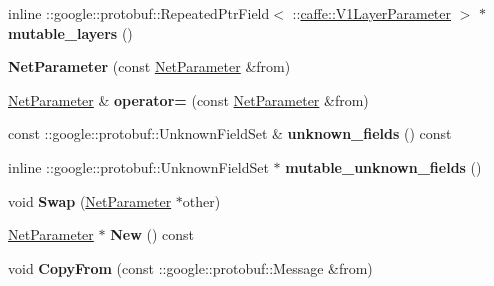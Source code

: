 \begin{DoxyCompactItemize}
\item 
\mbox{\label{classcaffe_1_1_net_parameter_a1a7e3aa151f44233c46fb4d8c928e6c4}} 
inline \+::google\+::protobuf\+::\+Repeated\+Ptr\+Field$<$ \+::\mbox{\hyperlink{classcaffe_1_1_v1_layer_parameter}{caffe\+::\+V1\+Layer\+Parameter}} $>$ $\ast$ {\bfseries mutable\+\_\+layers} ()
\item 
\mbox{\label{classcaffe_1_1_net_parameter_a0d81cc5257aa64aa05868550571624da}} 
{\bfseries Net\+Parameter} (const \mbox{\hyperlink{classcaffe_1_1_net_parameter}{Net\+Parameter}} \&from)
\item 
\mbox{\label{classcaffe_1_1_net_parameter_a2a2737325d6ff315c04d431a873dfb5b}} 
\mbox{\hyperlink{classcaffe_1_1_net_parameter}{Net\+Parameter}} \& {\bfseries operator=} (const \mbox{\hyperlink{classcaffe_1_1_net_parameter}{Net\+Parameter}} \&from)
\item 
\mbox{\label{classcaffe_1_1_net_parameter_a6ed9cbc10b53fbea32d2dfe0bf56fe19}} 
const \+::google\+::protobuf\+::\+Unknown\+Field\+Set \& {\bfseries unknown\+\_\+fields} () const
\item 
\mbox{\label{classcaffe_1_1_net_parameter_aaf4a2a26ac20940adc84b5920a089172}} 
inline \+::google\+::protobuf\+::\+Unknown\+Field\+Set $\ast$ {\bfseries mutable\+\_\+unknown\+\_\+fields} ()
\item 
\mbox{\label{classcaffe_1_1_net_parameter_aaf32716587fbdcfc1fa9c117562c42fd}} 
void {\bfseries Swap} (\mbox{\hyperlink{classcaffe_1_1_net_parameter}{Net\+Parameter}} $\ast$other)
\item 
\mbox{\label{classcaffe_1_1_net_parameter_a9325a430e56f1fadd3aeee0068dd6959}} 
\mbox{\hyperlink{classcaffe_1_1_net_parameter}{Net\+Parameter}} $\ast$ {\bfseries New} () const
\item 
\mbox{\label{classcaffe_1_1_net_parameter_aae3cec437cedde7535e5813746696367}} 
void {\bfseries Copy\+From} (const \+::google\+::protobuf\+::\+Message \&from)
\item 

\end{DoxyCompactItemize}
